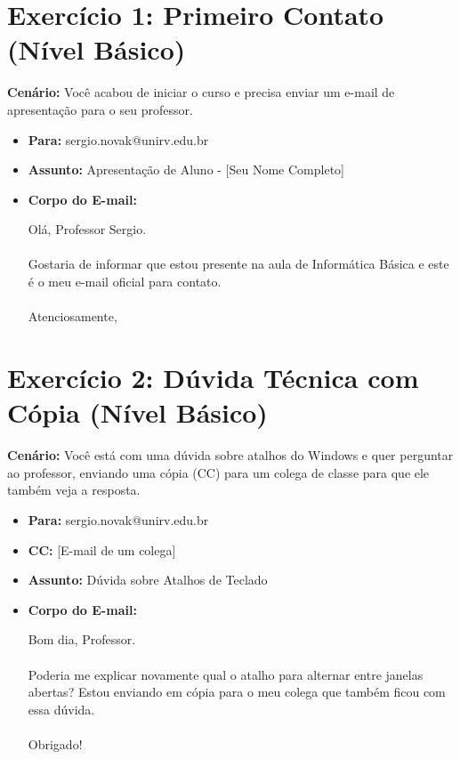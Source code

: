 \documentclass[12pt,a4paper]{article}
\begin{document}
\section*{Exercício 1: Primeiro Contato (Nível Básico)}

\textbf{Cenário:} Você acabou de iniciar o curso e precisa enviar um e-mail de apresentação para o seu professor.

\begin{itemize}[label=$\square$]
    \item \textbf{Para:} sergio.novak@unirv.edu.br
    \item \textbf{Assunto:} Apresentação de Aluno - [Seu Nome Completo]
    \item \textbf{Corpo do E-mail:}
    \begin{tcolorbox}[colback=gray!5, colframe=gray!50]
        Olá, Professor Sergio.\\
        \\
        Gostaria de informar que estou presente na aula de Informática Básica e este é o meu e-mail oficial para contato.\\
        \\
        Atenciosamente,\\ 
    \end{tcolorbox}
\end{itemize}
\newpage
\section*{Exercício 2: Dúvida Técnica com Cópia (Nível Básico)}

\textbf{Cenário:} Você está com uma dúvida sobre atalhos do Windows e quer perguntar ao professor, enviando uma cópia (CC) para um colega de classe para que ele também veja a resposta.

\begin{itemize}[label=$\square$]
    \item \textbf{Para:} sergio.novak@unirv.edu.br
    \item \textbf{CC:} [E-mail de um colega]
    \item \textbf{Assunto:} Dúvida sobre Atalhos de Teclado
    \item \textbf{Corpo do E-mail:}
    \begin{tcolorbox}[colback=gray!5, colframe=gray!50]
        Bom dia, Professor.\\
        \\
        Poderia me explicar novamente qual o atalho para alternar entre janelas abertas? Estou enviando em cópia para o meu colega que também ficou com essa dúvida.\\
        \\
        Obrigado!
    \end{tcolorbox}
\end{itemize}
\end{document}

